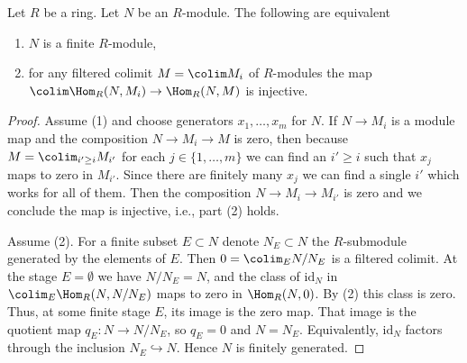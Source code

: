 \begin{lemma}
\label{editorial-source-lemma-characterize-finite-module-hom}
Let $R$ be a ring. Let $N$ be an $R$-module. The following are equivalent
\begin{enumerate}
\item $N$ is a finite $R$-module,
\item for any filtered colimit $M = \colim M_i$ of $R$-modules the map
$\colim \Hom_R(N, M_i) \to \Hom_R(N, M)$ is injective.
\end{enumerate}
\end{lemma}

\begin{proof}
Assume (1) and choose generators $x_1, \ldots, x_m$ for $N$.
If $N \to M_i$ is a module map and the composition
$N \to M_i \to M$ is zero, then because $M = \colim_{i' \geq i} M_{i'}$
for each $j \in \{1, \ldots, m\}$ we can find an $i' \geq i$ such that
$x_j$ maps to zero in $M_{i'}$. Since there are finitely many
$x_j$ we can find a single $i'$ which works for all of them.
Then the composition $N \to M_i \to M_{i'}$ is zero and we conclude
the map is injective, i.e., part (2) holds.

\medskip\noindent
Assume (2). For a finite subset $E \subset N$ denote $N_E \subset N$
the $R$-submodule generated by the elements of $E$. Then
$0 = \colim_E N/N_E$ is a filtered colimit. At the stage
$E = \emptyset$ we have $N/N_E = N$, and the class of
$\mathrm{id}_N$ in $\colim_E\Hom_R(N, N/N_E)$ maps to zero in
$\Hom_R(N, 0)$. By (2) this class is zero. Thus, at some finite
stage $E$, its image is the zero map. That image is the quotient
map $q_E : N \to N/N_E$, so $q_E = 0$ and $N = N_E$.
Equivalently, $\mathrm{id}_N$ factors through the inclusion
$N_E \hookrightarrow N$. Hence $N$ is finitely generated.
\end{proof}
